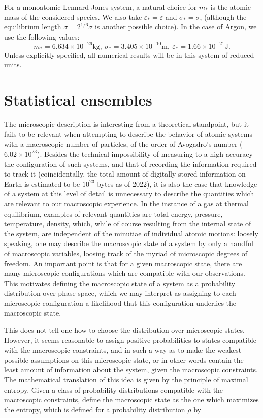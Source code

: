 For a monoatomic Lennard-Jones system, a natural choice for $m_*$ is the atomic mass of the considered species. We also take $\varepsilon_*=\varepsilon$ and $\sigma_*=\sigma$, (although the equilibrium length $\sigma=2^{1/6}\sigma$ is another possible choice). In the case of Argon, we use the following values:
$$m_*=6.634 \times 10 ^{-26} \text{kg},\ \sigma_*=3.405 \times 10^{-10} \text{m},\ \varepsilon_*=1.66 \times 10^{-21} \text{J}.$$
Unless explicitly specified, all numerical results will be in this system of reduced units.

\section{Statistical ensembles}
The microscopic description is interesting from a theoretical standpoint, but it fails to be relevant when attempting to describe the behavior of atomic systems with a macroscopic number of particles, of the order of Avogadro's number ($6.02 \times 10^{23} $).
Besides the technical impossibility of measuring to a high accuracy the configuration of such systems, and that of recording the information required to track it (coincidentally, the total amount of digitally stored information on Earth is estimated to be $10^{23}$ bytes as of 2022), it is also the case that knowledge of a system at this level of detail is unnecessary to describe the quantities which are relevant to our macroscopic experience.
In the instance of a gas at thermal equilibrium, examples of relevant quantities are total energy, pressure, temperature, density, which, while of course resulting from the internal state of the system, are independent of the minutiae of individual atomic motions: loosely speaking, one may describe the macroscopic state of a system by only a handful of macroscopic variables, loosing track of the myriad of microscopic degrees of freedom.
An important point is that for a given macroscopic state, there are many microscopic configurations which are compatible with our observations. This motivates defining the macroscopic state of a system as a probability distribution over phase space, which we may interpret as assigning to each microscopic configuration a likelihood that this configuration underlies the macroscopic state.

This does not tell one how to choose the distribution over microscopic states. However, it seems reasonable to assign positive probabilities to states compatible with the macroscopic constraints, and in such a way as to make the weakest possible assumptions on this microscopic state, or in other words contain the least amount of information about the system, given the macroscopic constraints. The mathematical translation of this idea is given by the principle of maximal entropy. Given a class of probability distributions compatible with the macroscopic constraints, define the macroscopic state as the one which maximizes the entropy, which is defined for a probability distribution $\rho$ by

